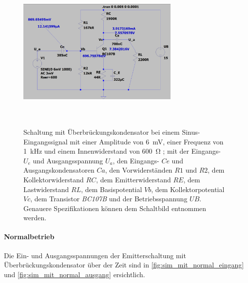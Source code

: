 \documentclass[12pt,english,ngerman]{scrartcl}
\begin{document}
\begin{figure}[H]
    \centering
    \includegraphics[width=8cm, height=8cm,keepaspectratio]{./figures/mitkond/messwertemitueberbrueckung.png}
    \caption{Schaltung mit Überbrückungskondensator bei einem Sinus-Eingangssignal
    mit einer Amplitude von \SI{6}{\milli\volt}, einer Frequenz von \SI{1}{\kilo\hertz} und einem
    Innenwiderstand von \SI{600}{\ohm} ; mit der Eingangs- $U_e$ und
    Ausgangsspannung $U_a$, den Eingangs- $Ce$ und Ausgangskondensatoren $Ca$, den
    Vorwiderständen $R1$ und $R2$, dem Kollektorwiderstand $RC$, dem
    Emitterwiderstand $RE$, dem Lastwiderstand $RL$, dem Basispotential $Vb$, dem
    Kollektorpotential $Vc$, dem Transistor \textit{BC107B} und der
    Betriebsspannung $UB$. Genauere Spezifikationen können dem Schaltbild entnommen
    werden.}
    \label{fig:schaltungmitkond}
\end{figure}

\paragraph{Normalbetrieb}

Die Ein- und Ausgangsspannungen der Emitterschaltung mit
Überbrückungskondensator über der Zeit sind in \autoref{fig:sim_mit_normal_eingang} und \autoref{fig:sim_mit_normal_ausgang}
ersichtlich.
\end{document}
